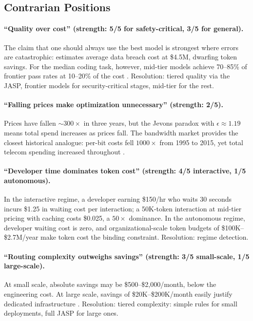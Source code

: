 \documentclass[11pt, a4paper]{googledeepmind}
\begin{document}
\subsection{Contrarian Positions}

\paragraph{``Quality over cost'' (strength: 5/5 for safety-critical, 3/5 for general).}
The claim that one should always use the best model is strongest where errors are catastrophic: \citep{ibmponemon2025} estimates average data breach cost at \$4.5M, dwarfing token savings. For the median coding task, however, mid-tier models achieve 70--85\% of frontier pass rates at 10--20\% of the cost \citep{jetbrains2025}. Resolution: tiered quality via the JASP, frontier models for security-critical stages, mid-tier for the rest.

\paragraph{``Falling prices make optimization unnecessary'' (strength: 2/5).}
Prices have fallen $\sim$$300\times$ in three years, but the Jevons paradox with $\epsilon \approx 1.19$ means total spend increases as prices fall. The bandwidth market provides the closest historical analogue: per-bit costs fell $1000\times$ from 1995 to 2015, yet total telecom spending increased throughout \citep{sorrell2009}.

\paragraph{``Developer time dominates token cost'' (strength: 4/5 interactive, 1/5 autonomous).}
In the interactive regime, a developer earning \$150/hr who waits 30 seconds incurs \$1.25 in waiting cost per interaction; a 50K-token interaction at mid-tier pricing with caching costs \$0.025, a $50\times$ dominance. In the autonomous regime, developer waiting cost is zero, and organizational-scale token budgets of \$100K--\$2.7M/year make token cost the binding constraint. Resolution: regime detection.

\paragraph{``Routing complexity outweighs savings'' (strength: 3/5 small-scale, 1/5 large-scale).}
At small scale, absolute savings may be \$500--\$2{,}000/month, below the engineering cost. At large scale, savings of \$20K--\$200K/month easily justify dedicated infrastructure \citep{finops2023}. Resolution: tiered complexity: simple rules for small deployments, full JASP for large ones.
\end{document}
